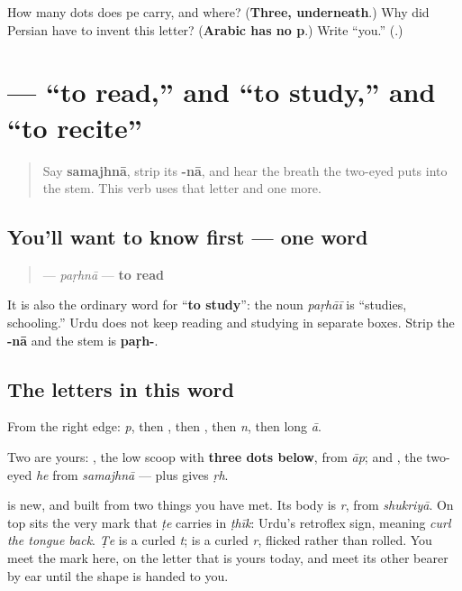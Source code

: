 \begin{tcolorbox}[breakable,colback=teal!4,colframe=teal!35!black,title={Before you move on}]
How many dots does pe carry, and where? (\textbf{Three, underneath}.) Why did Persian have to invent this letter? (\textbf{Arabic has no p}.) Write \textquotedblleft{}you.\textquotedblright{} (\textbf{}.)
\end{tcolorbox}
\section[\texorpdfstring{\ur{پڑھنا} (paṛhnā)}{پڑھنا (paṛhnā)}]{ — “to read,” and “to study,” and “to recite”}

\label{lesson:UR-C07-parhna}



\begin{quote}
Say \textbf{samajhnā}, strip its \textbf{-nā}, and hear the breath the two-eyed \textbf{} puts into the stem. This verb uses that letter and one more.
\end{quote}

\subsection*{You'll want to know first — one word}
\begin{quote}
\textbf{} — \emph{paṛhnā} — \textbf{to read}
\end{quote}

It is also the ordinary word for “\textbf{to study}”: the noun \emph{paṛhāī} is “studies, schooling.” Urdu does not keep reading and studying in separate boxes. Strip the \textbf{-nā} and the stem is \textbf{paṛh-}.

\subsection*{The letters in this word}
From the right edge: \textbf{} \emph{p}, then \textbf{}, then \textbf{}, then \textbf{} \emph{n}, then \textbf{} long \emph{ā}.

Two are yours: \textbf{}, the low scoop with \textbf{three dots below}, from \textbf{} \emph{āp}; and \textbf{}, the two-eyed \emph{he} from \emph{samajhnā} — \textbf{} plus \textbf{} gives \emph{ṛh}.

\textbf{} is new, and built from two things you have met. Its body is \textbf{} \emph{r}, from \textbf{} \emph{shukriyā}. On top sits the very mark that \emph{ṭe} carries in \emph{ṭhīk}: Urdu's retroflex sign, meaning \emph{curl the tongue back}. \emph{Ṭe} is a curled \emph{t}; \textbf{} is a curled \emph{r}, flicked rather than rolled. You meet the mark here, on the letter that is yours today, and meet its other bearer by ear until the shape is handed to you.

